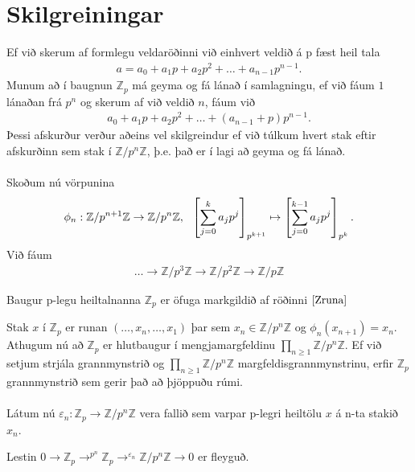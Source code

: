 \section*{Skilgreiningar}
Ef við skerum af formlegu veldaröðinni við einhvert veldið á p fæst heil tala 
\begin{align*}
a = a_0 + a_1 p + a_2 p^2 + \ldots + a_{n-1}p^{n-1}. 
\end{align*}
Munum að í baugnun $\mathbb{Z}_p$ má geyma og fá lánað í samlagningu, ef við 
fáum $1$ lánaðan frá $p^n$ og skerum af við veldið $n$, fáum við 
\begin{align*}
 a_0 + a_1 p + a_2 p^2 + \ldots + (a_{n-1} + p)p^{n-1}.
\end{align*}
Þessi afskurður verður aðeins vel skilgreindur ef við túlkum hvert 
stak eftir afskurðinn sem stak í $\mathbb{Z}/p^n \mathbb{Z}$, þ.e. það 
er í lagi að geyma og fá lánað.\\
\\Skoðum nú vörpunina
\begin{align*}
 \centering \phi_n : \mathbb{Z}/p^{n+1} \mathbb{Z} \rightarrow 
 \mathbb{Z}/p^{n} \mathbb{Z}, \ \  \left[\sum_{j=0}^k a_j p^j \right]
_{p^{k+1}} \mapsto \left[\sum_{j=0}^{k-1} a_j p^j \right]_{p^k}.
\end{align*}
Við fáum
\begin{align}\label{Zruna}
 \ldots \rightarrow \mathbb{Z}/p^{3} \mathbb{Z} \rightarrow \mathbb{Z}/p^{2} 
\mathbb{Z} \rightarrow \mathbb{Z}/p \mathbb{Z}
\end{align}
\begin{skilgr}
 Baugur p-legu heiltalnanna $\mathbb{Z}_p$ er öfuga markgildið af 
röðinni $\ref{Zruna}$
\end{skilgr}
Stak $x$ í $\mathbb{Z}_p$ er runan $(\ldots , x_n, \ldots, x_1)$ þar sem 
$x_n \in \mathbb{Z}/p^n\mathbb{Z}$ og $\phi_n(x_{n+1}) = x_{n}$.
Athugum nú að $\mathbb{Z}_p$ er hlutbaugur í mengjamargfeldinu
 $\prod_{n \geq 1} \mathbb{Z}/p^n\mathbb{Z}$. Ef við setjum strjála 
grannmynstrið og $\prod_{n \geq 1} \mathbb{Z}/p^n\mathbb{Z}$ 
margfeldisgrannmynstrinu, erfir $\mathbb{Z}_p$ grannmynstrið sem 
gerir það að þjöppuðu rúmi.\\
\\Látum nú $\varepsilon_n : \mathbb{Z}_p \rightarrow \mathbb{Z}/p^n 
\mathbb{Z}$ vera fallið sem varpar p-legri heiltölu $x$ á n-ta stakið $x_n$.
\begin{setn}
 Lestin $0 \rightarrow \mathbb{Z}_p \rightarrow^{p^n} \mathbb{Z}_p 
\rightarrow^{\varepsilon_n} \mathbb{Z}/p^n\mathbb{Z} \rightarrow 0$ 
er fleyguð.
\end{setn}
